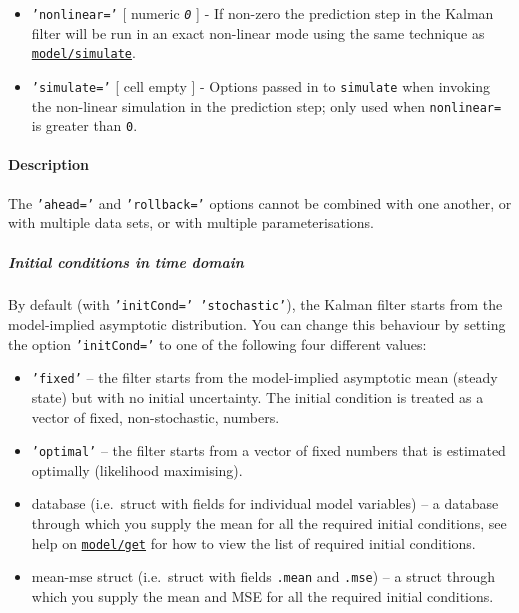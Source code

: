 \begin{itemize}
\item
  \texttt{'nonlinear='} {[} numeric \textbar{} \emph{\texttt{0}} {]} -
  If non-zero the prediction step in the Kalman filter will be run in an
  exact non-linear mode using the same technique as
  \href{model/simulate}{\texttt{model/simulate}}.
\item
  \texttt{'simulate='} {[} cell \textbar{} empty {]} - Options passed in
  to \texttt{simulate} when invoking the non-linear simulation in the
  prediction step; only used when \texttt{nonlinear=} is greater than
  \texttt{0}.
\end{itemize}

\paragraph{Description}\label{description}

The \texttt{'ahead='} and \texttt{'rollback='} options cannot be
combined with one another, or with multiple data sets, or with multiple
parameterisations.

\subparagraph{Initial conditions in time
domain}\label{initial-conditions-in-time-domain}

By default (with \texttt{'initCond=' 'stochastic'}), the Kalman filter
starts from the model-implied asymptotic distribution. You can change
this behaviour by setting the option \texttt{'initCond='} to one of the
following four different values:

\begin{itemize}
\item
  \texttt{'fixed'} -- the filter starts from the model-implied
  asymptotic mean (steady state) but with no initial uncertainty. The
  initial condition is treated as a vector of fixed, non-stochastic,
  numbers.
\item
  \texttt{'optimal'} -- the filter starts from a vector of fixed numbers
  that is estimated optimally (likelihood maximising).
\item
  database (i.e.~struct with fields for individual model variables) -- a
  database through which you supply the mean for all the required
  initial conditions, see help on \href{model/get}{\texttt{model/get}}
  for how to view the list of required initial conditions.
\item
  mean-mse struct (i.e.~struct with fields \texttt{.mean} and
  \texttt{.mse}) -- a struct through which you supply the mean and MSE
  for all the required initial conditions.
\end{itemize}

